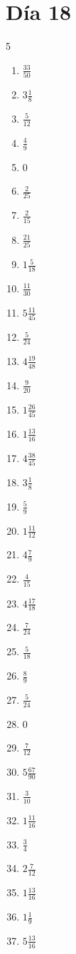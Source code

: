 \documentclass[12pt]{article}
\begin{document}
\section*{Día 18}
\begin{multicols}{5}\begin{enumerate}
\item $ \frac{33}{50} $
\item $ 3 \frac{1}{8} $
\item $ \frac{5}{12} $
\item $ \frac{4}{9} $
\item $ 0 $
\item $ \frac{2}{25} $
\item $ \frac{2}{15} $
\item $ \frac{21}{25} $
\item $ 1 \frac{5}{18} $
\item $ \frac{11}{30} $
\item $ 5 \frac{11}{45} $
\item $ \frac{5}{24} $
\item $ 4 \frac{19}{48} $
\item $ \frac{9}{20} $
\item $ 1 \frac{26}{45} $
\item $ 1 \frac{13}{16} $
\item $ 4 \frac{38}{45} $
\item $ 3 \frac{1}{8} $
\item $ \frac{5}{9} $
\item $ 1 \frac{11}{12} $
\item $ 4 \frac{7}{9} $
\item $ \frac{4}{15} $
\item $ 4 \frac{17}{18} $
\item $ \frac{7}{24} $
\item $ \frac{5}{18} $
\item $ \frac{8}{9} $
\item $ \frac{5}{24} $
\item $ 0 $
\item $ \frac{7}{12} $
\item $ 5 \frac{67}{90} $
\item $ \frac{3}{10} $
\item $ 1 \frac{11}{16} $
\item $ \frac{3}{4} $
\item $ 2 \frac{7}{12} $
\item $ 1 \frac{13}{16} $
\item $ 1 \frac{1}{9} $
\item $ 5 \frac{13}{16} $

\end{enumerate}
\end{multicols}
\end{document}
